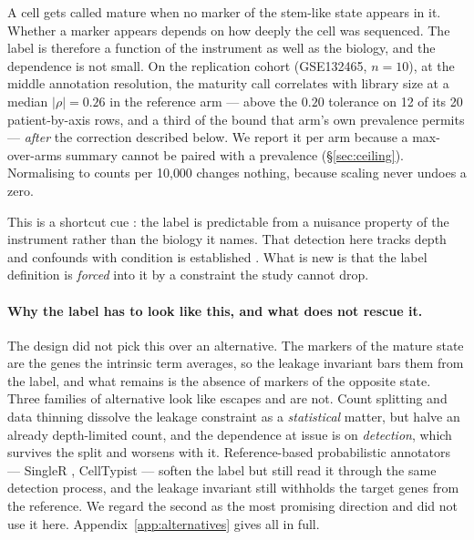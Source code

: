 \documentclass{article}
\begin{document}
A cell gets called mature when no marker of the stem-like state appears in it.
Whether a marker appears depends on how deeply the cell was sequenced. The
label is therefore a function of the instrument as well as the biology, and the
dependence is not small. On the replication cohort (GSE132465, $n = 10$), at
the middle annotation resolution, the maturity call correlates with library
size at a median $|\rho| = 0.26$ in the reference arm --- above the $0.20$
tolerance on 12 of its 20 patient-by-axis rows, and a third of the bound that
arm's own prevalence permits --- \emph{after} the correction described below.
We report it per arm because a max-over-arms summary cannot be paired with a
prevalence (\S\ref{sec:ceiling}). Normalising to counts per 10{,}000 changes
nothing, because scaling never undoes a zero.

This is a shortcut cue \citep{geirhos2020}: the label is predictable from a
nuisance property of the instrument rather than the biology it names. That
detection here tracks depth and confounds with condition is established
\citep{hicks2018,luecken2019}. What is new is that the label definition is
\emph{forced} into it by a constraint the study cannot drop.

\paragraph{Why the label has to look like this, and what does not rescue it.}
The design did not pick this over an alternative. The markers of the mature state
are the genes the intrinsic term averages, so the leakage invariant bars them
from the label, and what remains is the absence of markers of the opposite
state. Three families of alternative look like escapes and are not. Count splitting
\citep{neufeld2023} and data thinning dissolve the leakage constraint as a
\emph{statistical} matter, but halve an already depth-limited count, and the
dependence at issue is on \emph{detection}, which survives the split and worsens
with it. Reference-based probabilistic annotators --- SingleR \citep{aran2019},
CellTypist \citep{dominguezconde2022} --- soften the label but still read it
through the same detection process, and the leakage invariant still withholds the
target genes from the reference. We regard the second as the most promising
direction and did not use it here. Appendix~\ref{app:alternatives} gives all in
full.
\end{document}
